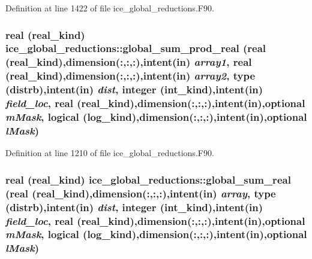 Definition at line 1422 of file ice\_\-global\_\-reductions.F90.\hypertarget{namespaceice__global__reductions_a8ded0a6550ccfe08da739b778ccdadf3}{
\subsubsection[{global\_\-sum\_\-prod\_\-real}]{\setlength{\rightskip}{0pt plus 5cm}real (real\_\-kind) ice\_\-global\_\-reductions::global\_\-sum\_\-prod\_\-real (real (real\_\-kind),dimension(:,:,:),intent(in) {\em array1}, \/  real (real\_\-kind),dimension(:,:,:),intent(in) {\em array2}, \/  type (distrb),intent(in) {\em dist}, \/  integer (int\_\-kind),intent(in) {\em field\_\-loc}, \/  real (real\_\-kind),dimension(:,:,:),intent(in),optional {\em mMask}, \/  logical (log\_\-kind),dimension(:,:,:),intent(in),optional {\em lMask})}}
\label{namespaceice__global__reductions_a8ded0a6550ccfe08da739b778ccdadf3}


Definition at line 1210 of file ice\_\-global\_\-reductions.F90.\hypertarget{namespaceice__global__reductions_a8e8362fe94cfeec02a6fd9ee6ffc6b3f}{
\subsubsection[{global\_\-sum\_\-real}]{\setlength{\rightskip}{0pt plus 5cm}real (real\_\-kind) ice\_\-global\_\-reductions::global\_\-sum\_\-real (real (real\_\-kind),dimension(:,:,:),intent(in) {\em array}, \/  type (distrb),intent(in) {\em dist}, \/  integer (int\_\-kind),intent(in) {\em field\_\-loc}, \/  real (real\_\-kind),dimension(:,:,:),intent(in),optional {\em mMask}, \/  logical (log\_\-kind),dimension(:,:,:),intent(in),optional {\em lMask})}}
\label{namespaceice__global__reductions_a8e8362fe94cfeec02a6fd9ee6ffc6b3f}


